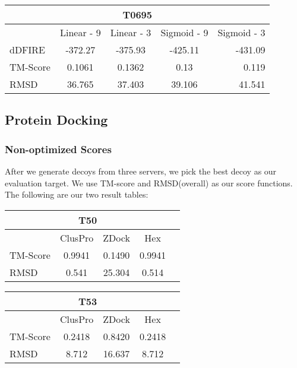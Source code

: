 \documentclass{article}
\begin{document}
\begin{center}
\begin{tabular}{|l|c|c|c|r|}
\multicolumn{5}{c}{T0695} \\
    \hline
      & Linear - 9 & Linear - 3 & Sigmoid - 9 & Sigmoid - 3\\ \hline
    dDFIRE &  -372.27 & -375.93 & -425.11 & -431.09 \\ \hline
    TM-Score & 0.1061 & 0.1362 & 0.13 & 0.119 \\ \hline
    RMSD & 36.765 & 37.403 & 39.106 & 41.541 \\
    \hline
    \end{tabular}
\end{center}


\subsection{Protein Docking}

\subsubsection*{Non-optimized Scores}

After we generate decoys from three servers, we pick the best decoy as our evaluation target. We use TM-score and RMSD(overall) as our score functions. The following are our two result tables:

\begin{center}
\begin{tabular}{|l|c|c|c|r|}
\multicolumn{4}{c}{T50} \\
    \hline
      & ClusPro & ZDock & Hex \\ \hline
    TM-Score & 0.9941 & 0.1490 & 0.9941 \\ \hline
    RMSD & 0.541 & 25.304 & 0.514 \\
    \hline
    \end{tabular}
\end{center}

\begin{center}
\begin{tabular}{|l|c|c|c|r|}
\multicolumn{4}{c}{T53} \\
    \hline
      & ClusPro & ZDock & Hex \\ \hline
    TM-Score & 0.2418 & 0.8420 & 0.2418 \\ \hline
    RMSD & 8.712 & 16.637 & 8.712 \\
    \hline
    \end{tabular}
\end{center}
\end{document}
